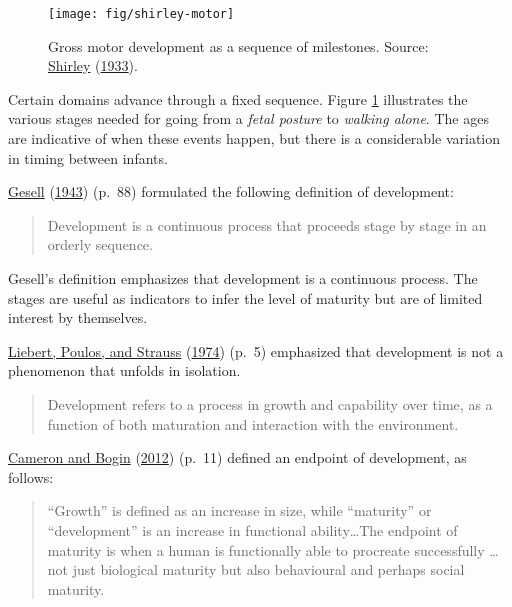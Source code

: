 \documentclass[
]{book}
\begin{document}
\begin{figure}

{\centering \texttt{[image: fig/shirley-motor]} 

}

\caption{Gross motor development as a sequence of milestones. Source: \protect\hyperlink{ref-shirley1933}{Shirley} (\protect\hyperlink{ref-shirley1933}{1933}).}\label{fig:shirleyplot}
\end{figure}



Certain domains advance through a fixed sequence. Figure \ref{fig:shirleyplot} illustrates the various stages needed for going from a \emph{fetal posture} to \emph{walking alone}. The ages are indicative of when these events happen, but there is a considerable variation in timing between infants.

\protect\hyperlink{ref-gesell1943}{Gesell} (\protect\hyperlink{ref-gesell1943}{1943}) (p.~88) formulated the following definition of development:

\begin{quote}
Development is a continuous process that proceeds stage by stage in an orderly sequence.
\end{quote}

Gesell's definition emphasizes that development is a continuous process. The stages are useful as indicators to infer the level of maturity but are of limited interest by themselves.

\protect\hyperlink{ref-liebert1974}{Liebert, Poulos, and Strauss} (\protect\hyperlink{ref-liebert1974}{1974}) (p.~5) emphasized that development is not a phenomenon that unfolds in isolation.

\begin{quote}
Development refers to a process in growth and capability over time, as a function of both maturation and interaction with the environment.
\end{quote}

\protect\hyperlink{ref-cameron2012}{Cameron and Bogin} (\protect\hyperlink{ref-cameron2012}{2012}) (p.~11) defined an endpoint of development, as follows:

\begin{quote}
``Growth'' is defined as an increase in size, while ``maturity'' or ``development'' is an increase in functional ability\ldots The endpoint of maturity is when a human is functionally able to procreate successfully \ldots{} not just biological maturity but also behavioural and perhaps social maturity.
\end{quote}
\end{document}

